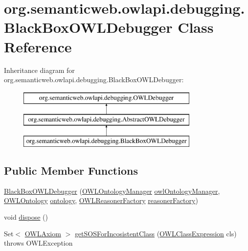 \hypertarget{classorg_1_1semanticweb_1_1owlapi_1_1debugging_1_1_black_box_o_w_l_debugger}{\section{org.\-semanticweb.\-owlapi.\-debugging.\-Black\-Box\-O\-W\-L\-Debugger Class Reference}
\label{classorg_1_1semanticweb_1_1owlapi_1_1debugging_1_1_black_box_o_w_l_debugger}
}
Inheritance diagram for org.\-semanticweb.\-owlapi.\-debugging.\-Black\-Box\-O\-W\-L\-Debugger\-:\begin{figure}[H]
\begin{center}
\leavevmode
\includegraphics[height=3.000000cm]{classorg_1_1semanticweb_1_1owlapi_1_1debugging_1_1_black_box_o_w_l_debugger}
\end{center}
\end{figure}
\subsection*{Public Member Functions}
\begin{DoxyCompactItemize}
\item 
\hyperlink{classorg_1_1semanticweb_1_1owlapi_1_1debugging_1_1_black_box_o_w_l_debugger_ab38413d99070f4c18fcd8d4f88c67f52}{Black\-Box\-O\-W\-L\-Debugger} (\hyperlink{interfaceorg_1_1semanticweb_1_1owlapi_1_1model_1_1_o_w_l_ontology_manager}{O\-W\-L\-Ontology\-Manager} \hyperlink{classorg_1_1semanticweb_1_1owlapi_1_1debugging_1_1_black_box_o_w_l_debugger_a64c02c68dbf9c247dc497a07a14e7e2e}{owl\-Ontology\-Manager}, \hyperlink{interfaceorg_1_1semanticweb_1_1owlapi_1_1model_1_1_o_w_l_ontology}{O\-W\-L\-Ontology} \hyperlink{classorg_1_1semanticweb_1_1owlapi_1_1debugging_1_1_abstract_o_w_l_debugger_a752fe8de84b07aa7d41877eb3a9e8167}{ontology}, \hyperlink{interfaceorg_1_1semanticweb_1_1owlapi_1_1reasoner_1_1_o_w_l_reasoner_factory}{O\-W\-L\-Reasoner\-Factory} \hyperlink{classorg_1_1semanticweb_1_1owlapi_1_1debugging_1_1_black_box_o_w_l_debugger_ae2abfae902c03812db4b1cd8bb179612}{reasoner\-Factory})
\item 
void \hyperlink{classorg_1_1semanticweb_1_1owlapi_1_1debugging_1_1_black_box_o_w_l_debugger_aad7e924d86b35f369a4f592b57ab31e2}{dispose} ()
\item 
Set$<$ \hyperlink{interfaceorg_1_1semanticweb_1_1owlapi_1_1model_1_1_o_w_l_axiom}{O\-W\-L\-Axiom} $>$ \hyperlink{classorg_1_1semanticweb_1_1owlapi_1_1debugging_1_1_black_box_o_w_l_debugger_ac88269f0c16725a17f99f6bbda65e923}{get\-S\-O\-S\-For\-Incosistent\-Class} (\hyperlink{interfaceorg_1_1semanticweb_1_1owlapi_1_1model_1_1_o_w_l_class_expression}{O\-W\-L\-Class\-Expression} cls)  throws O\-W\-L\-Exception 
\end{DoxyCompactItemize}
